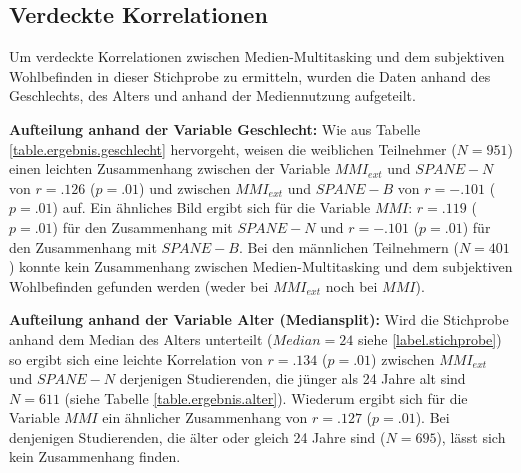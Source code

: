 \subsection{Verdeckte Korrelationen}
Um verdeckte Korrelationen zwischen Medien-Multitasking und dem subjektiven Wohlbefinden in dieser Stichprobe zu ermitteln, wurden die Daten anhand des Geschlechts, des Alters und anhand der Mediennutzung aufgeteilt. 
\par
\textbf{Aufteilung anhand der Variable Geschlecht:} Wie aus Tabelle \ref{table.ergebnis.geschlecht} hervorgeht, weisen die weiblichen Teilnehmer ($N=951$) einen leichten Zusammenhang zwischen der Variable $MMI_{ext}$ und $SPANE-N$ von $r=.126$ ($p=.01$) und zwischen  $MMI_{ext}$ und $SPANE-B$ von $r=-.101$ ($p=.01$) auf. Ein ähnliches Bild ergibt sich für die Variable $MMI$: $r=.119$ ($p=.01$) für den Zusammenhang mit $SPANE-N$ und $r=-.101$ ($p=.01$) für den Zusammenhang mit $SPANE-B$. Bei den männlichen Teilnehmern ($N=401$) konnte kein Zusammenhang zwischen Medien-Multitasking und dem subjektiven Wohlbefinden gefunden werden (weder bei $MMI_{ext}$ noch bei $MMI$).
\par
\textbf{Aufteilung anhand der Variable Alter (Mediansplit):} Wird die Stichprobe anhand dem Median des Alters unterteilt ($Median=24$ siehe \ref{label.stichprobe}) so ergibt sich eine leichte Korrelation von $r=.134$ ($p=.01$) zwischen $MMI_{ext}$ und $SPANE-N$ derjenigen Studierenden, die jünger als 24 Jahre alt sind $N=611$ (siehe Tabelle \ref{table.ergebnis.alter}). Wiederum ergibt sich für die Variable $MMI$ ein ähnlicher Zusammenhang von $r=.127$ ($p=.01$). Bei denjenigen Studierenden, die älter oder gleich 24 Jahre sind ($N=695$), lässt sich kein Zusammenhang finden.
\par
